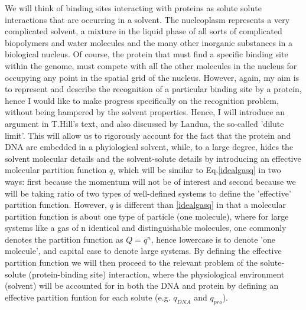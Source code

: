  We will think of binding sites interacting with proteins as solute solute interactions that are occurring in a solvent.  The nucleoplasm represents a very complicated solvent, a mixture in the liquid phase of all sorts of complicated biopolymers and water molecules and the many other inorganic substances in a biological nucleus.  Of course, the protein that must find a specific binding site within the genome, must compete with all the other molecules in the nucleus for occupying any point in the spatial grid of the nucleus.  However, again, my aim is to represent and describe the recognition of a particular binding site by a protein, hence I would like to make progress specifically on the recognition problem, without being hampered by the solvent properties.  Hence, I will introduce an argument in T.Hill's text\cite{hill}, and also discussed by Landua\cite{landaumech}, the so-called 'dilute limit'.  This will allow us to rigorously account for the fact that the protein and DNA are embedded in a phyiological solvent, while, to a large degree, hides the solvent molecular details and the solvent-solute details by introducing an effective molecular partition function $q$, which will be similar to Eq.\ref{idealgasq} in two ways: first because the momentum will not be of interest and second because we will be taking ratio of two types of well-defined systems to define the 'effective' partition function.  However, $q$ is different than \ref{idealgasq} in that a molecular partition function is about one type of particle (one molecule), where for large systems like a gas of n identical and distinguishable molecules, one commonly denotes the partition function as $Q=q^n$, hence lowercase is to denote 'one molecule', and capital case to denote large systems.  By defining the effective partition function we will then proceed to the relevant problem of the solute-solute (protein-binding site) interaction, where the physiological environment (solvent) will be accounted for in both the DNA and protein by defining an effective partition funtion for each solute (e.g. $q_{DNA}$ and $q_{pro}$).
 
